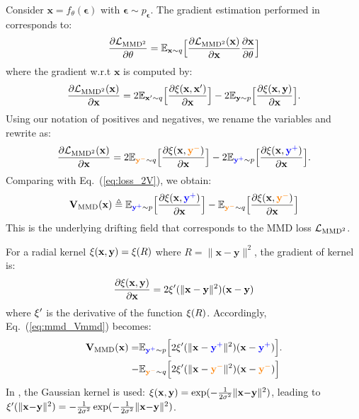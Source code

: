 \documentclass{article}
\newcommand{\vv}[1]{\mathbf{#1}}
\newcommand{\x}{\vv{x}}
\newcommand{\y}{\vv{y}}
\newcommand{\V}{\vv{V}}
\newcommand{\yp}{{\textcolor{blue}{\vv{y}^{+}}}}
\newcommand{\yn}{{\textcolor{orange}{\vv{y}^{-}}}}
\newcommand{\e}{{\boldsymbol{\epsilon}}}
\theoremstyle{plain}
\theoremstyle{definition}
\theoremstyle{remark}
\begin{document}
Consider $\x=f_\theta(\e)$ with $\e\sim p_\e$. The gradient estimation performed in \cite{li2015generative} corresponds to:
\begin{equation}
\frac{\partial\LMMD}{\partial {\theta}} =
\mathbb{E}_{\x{\sim}q}\Big[\frac{\partial\LMMD(\x)}{\partial {\x}} \frac{\partial\x}{\partial\theta}
\Big]
\end{equation}
where the gradient w.r.t $\x$ is computed by:
\begin{equation}
\frac{\partial\LMMD(\x)}{\partial {\x}}
=
2\mathbb{E}_{\x'{\sim}q} \Big[\frac{\partial \kk(\x,\x')}{\partial{\x}}\Big]
-
2\mathbb{E}_{\y{\sim}p} \Big[\frac{\partial \kk(\x,\y)}{\partial{\x}}\Big].
\end{equation}
Using our notation of positives and negatives, we rename the variables and rewrite as:
\begin{equation}
\label{eq:mmd_eq4}
\frac{\partial\mathcal L_{\text{MMD}^2}(\x)}{\partial {\x}}
=
2\mathbb{E}_{\yn{\sim}q} \Big[\frac{\partial \kk(\x,\yn)}{\partial{\x}}\Big]
-
2\mathbb{E}_{\yp{\sim}p} \Big[\frac{\partial \kk(\x,\yp)}{\partial{\x}}\Big].
\end{equation}
Comparing with Eq.~(\ref{eq:loss_2V}), we obtain:
\begin{equation}
\label{eq:mmd_Vmmd}
\V_\text{MMD}(\x)
\triangleq
\mathbb{E}_{\yp{\sim}p} \Big[\frac{\partial \kk(\x,\yp)}{\partial{\x}}\Big]
-
\mathbb{E}_{\yn{\sim}q} \Big[\frac{\partial \kk(\x,\yn)}{\partial{\x}}\Big]
\end{equation}
This is the underlying drifting field that corresponds to the MMD loss $\mathcal{L}_{\text{MMD}^2}$.




For a radial kernel $\kk(\x, \y)=\kk(R)$ where  $R=\|\x - \y\|^2$, the gradient of kernel is:
\begin{equation}
\frac{\partial\kk(\x, \y)}{\partial\x} =
2\kk'(\|\x - \y\|^2)(\x - \y)
\end{equation}
where $\xi'$ is the derivative of the function $\xi(R)$.
Accordingly, Eq.~(\ref{eq:mmd_Vmmd}) becomes:
\begin{equation}
\begin{aligned}
\label{eq:mmd_Vmmd2}
\V_\text{MMD}(\x)
= &
\mathbb{E}_{\yp{\sim}p} \Big[
2\kk'(\|\x - \yp\|^2)(\x - \yp)
\Big].
\\ - &
\mathbb{E}_{\yn{\sim}q} \Big[
2\kk'(\|\x - \yn\|^2)(\x - \yn)
\Big]
\end{aligned}
\end{equation}
In \cite{li2015generative}, the Gaussian kernel is used: $\kk(\x, \y) = \exp (-\frac{1}{2\sigma^2} \|\x{-}\y\|^2)$, leading to $\kk'(\|\x{-}\y\|^2)=-\frac{1}{2\sigma^2}\exp (-\frac{1}{2\sigma^2} \|\x{-}\y\|^2)$.
\end{document}
